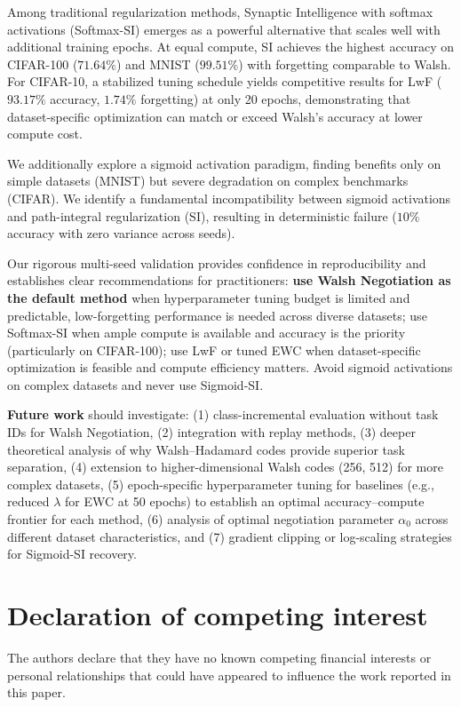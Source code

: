 \documentclass[preprint,review,12pt]{elsarticle}
\begin{document}
Among traditional regularization methods, Synaptic Intelligence with softmax activations (Softmax-SI) emerges as a powerful alternative that scales well with additional training epochs. At equal compute, SI achieves the highest accuracy on CIFAR-100 ($71.64\%$) and MNIST ($99.51\%$) with forgetting comparable to Walsh. For CIFAR-10, a stabilized tuning schedule yields competitive results for LwF ($93.17\%$ accuracy, $1.74\%$ forgetting) at only 20 epochs, demonstrating that dataset-specific optimization can match or exceed Walsh's accuracy at lower compute cost.

We additionally explore a sigmoid activation paradigm, finding benefits only on simple datasets (MNIST) but severe degradation on complex benchmarks (CIFAR). We identify a fundamental incompatibility between sigmoid activations and path-integral regularization (SI), resulting in deterministic failure ($10\%$ accuracy with zero variance across seeds).

Our rigorous multi-seed validation provides confidence in reproducibility and establishes clear recommendations for practitioners: \textbf{use Walsh Negotiation as the default method} when hyperparameter tuning budget is limited and predictable, low-forgetting performance is needed across diverse datasets; use Softmax-SI when ample compute is available and accuracy is the priority (particularly on CIFAR-100); use LwF or tuned EWC when dataset-specific optimization is feasible and compute efficiency matters. Avoid sigmoid activations on complex datasets and never use Sigmoid-SI.

\textbf{Future work} should investigate: (1) class-incremental evaluation without task IDs for Walsh Negotiation, (2) integration with replay methods, (3) deeper theoretical analysis of why Walsh--Hadamard codes provide superior task separation, (4) extension to higher-dimensional Walsh codes (256, 512) for more complex datasets, (5) epoch-specific hyperparameter tuning for baselines (e.g., reduced $\lambda$ for EWC at 50 epochs) to establish an optimal accuracy--compute frontier for each method, (6) analysis of optimal negotiation parameter $\alpha_0$ across different dataset characteristics, and (7) gradient clipping or log-scaling strategies for Sigmoid-SI recovery.

\section*{Declaration of competing interest}

The authors declare that they have no known competing financial interests or personal relationships that could have appeared to influence the work reported in this paper.
\end{document}
